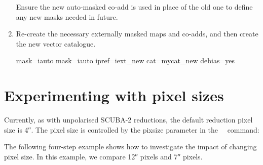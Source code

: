 \begin{enumerate}
  Ensure the new auto-masked co-add is used in place of the old one to
  define any new masks needed in future.

\begin{terminalv}
\end{terminalv}

\item Re-create the necessary externally masked maps and co-adds, and
  then create the new vector catalogue.

\begin{terminalv}
     mask=iauto
     mask=iauto ipref=iext_new cat=mycat_new debias=yes
\end{terminalv}
\end{enumerate}


\section{Experimenting with pixel sizes}

Currently, as with unpolarised SCUBA-2 reductions, the default
reduction pixel size is 4\si{\arcsecond}.  The pixel size is controlled by the
pixsize parameter in the \smurf\ \poltwomap\ command:

\begin{terminalv}
\end{terminalv}


The following four-step example shows how to investigate the impact of
changing pixel size.  In this example, we compare 12\si{\arcsecond}
pixels and 7\si{\arcsecond} pixels.

